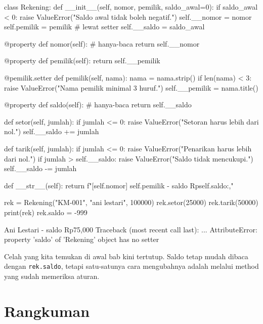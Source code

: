 \begin{kode}[rekening.py]
class Rekening:
    def __init__(self, nomor, pemilik, saldo_awal=0):
        if saldo_awal < 0:
            raise ValueError("Saldo awal tidak boleh negatif.")
        self.__nomor = nomor
        self.pemilik = pemilik            # lewat setter
        self.__saldo = saldo_awal

    @property
    def nomor(self):                      # hanya-baca
        return self.__nomor

    @property
    def pemilik(self):
        return self.__pemilik

    @pemilik.setter
    def pemilik(self, nama):
        nama = nama.strip()
        if len(nama) < 3:
            raise ValueError("Nama pemilik minimal 3 huruf.")
        self.__pemilik = nama.title()

    @property
    def saldo(self):                      # hanya-baca
        return self.__saldo

    def setor(self, jumlah):
        if jumlah <= 0:
            raise ValueError("Setoran harus lebih dari nol.")
        self.__saldo += jumlah

    def tarik(self, jumlah):
        if jumlah <= 0:
            raise ValueError("Penarikan harus lebih dari nol.")
        if jumlah > self.__saldo:
            raise ValueError("Saldo tidak mencukupi.")
        self.__saldo -= jumlah

    def __str__(self):
        return f"[{self.nomor}] {self.pemilik} - saldo Rp{self.saldo:,}"


rek = Rekening("KM-001", "ani lestari", 100000)
rek.setor(25000)
rek.tarik(50000)
print(rek)
rek.saldo = -999
\end{kode}

\begin{keluaran}
[KM-001] Ani Lestari - saldo Rp75,000
Traceback (most recent call last):
  ...
AttributeError: property 'saldo' of 'Rekening' object has no setter
\end{keluaran}

Celah yang kita temukan di awal bab kini tertutup. Saldo tetap mudah dibaca dengan \texttt{rek.saldo}, tetapi satu-satunya cara mengubahnya adalah melalui method yang sudah memeriksa aturan.

\section{Rangkuman}


